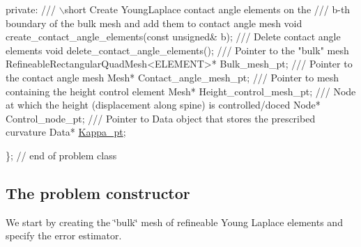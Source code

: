 \begin{DoxyCodeInclude}

\textcolor{keyword}{private}:
\textcolor{comment}{}
\textcolor{comment}{ /// \(\backslash\)short Create YoungLaplace contact angle elements on the }
\textcolor{comment}{ /// b-th boundary of the bulk mesh and add them to contact angle mesh}
\textcolor{comment}{} \textcolor{keywordtype}{void} create\_contact\_angle\_elements(\textcolor{keyword}{const} \textcolor{keywordtype}{unsigned}& b);
 \textcolor{comment}{}
\textcolor{comment}{ /// Delete contact angle elements }
\textcolor{comment}{} \textcolor{keywordtype}{void} delete\_contact\_angle\_elements();
\textcolor{comment}{}
\textcolor{comment}{ /// Pointer to the "bulk" mesh}
\textcolor{comment}{} RefineableRectangularQuadMesh<ELEMENT>* Bulk\_mesh\_pt;
\textcolor{comment}{}
\textcolor{comment}{ /// Pointer to the contact angle mesh}
\textcolor{comment}{} Mesh* Contact\_angle\_mesh\_pt;
\textcolor{comment}{}
\textcolor{comment}{ /// Pointer to mesh containing the height control element}
\textcolor{comment}{} Mesh* Height\_control\_mesh\_pt;
\textcolor{comment}{}
\textcolor{comment}{ /// Node at which the height (displacement along spine) is controlled/doced}
\textcolor{comment}{} Node* Control\_node\_pt;
\textcolor{comment}{}
\textcolor{comment}{ /// Pointer to Data object that stores the prescribed curvature}
\textcolor{comment}{} Data* \hyperlink{namespaceGlobalParameters_ac6234184cce40ab2c6bec92b37e4ae41}{Kappa\_pt};

\}; \textcolor{comment}{// end of problem class}

\end{DoxyCodeInclude}




 

\hypertarget{index_constr}{}\subsection{The problem constructor}\label{index_constr}
We start by creating the \char`\"{}bulk\char`\"{} mesh of refineable Young Laplace elements and specify the error estimator.


